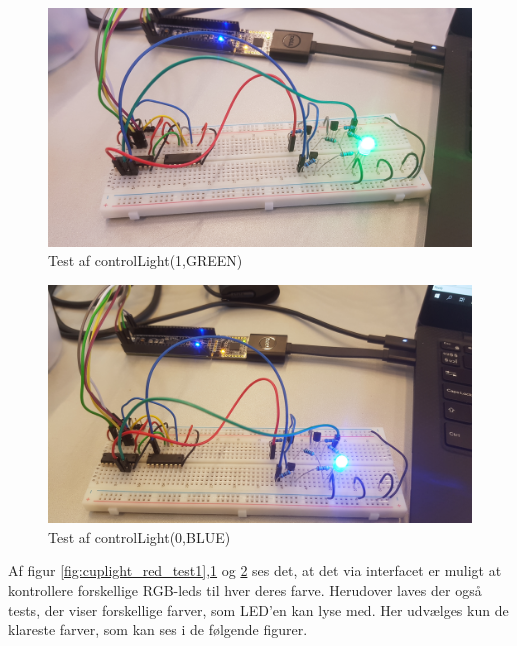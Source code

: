 \documentclass[Modultest/Modultest_main.tex]{subfiles}
\begin{document}
\begin{figure}[H]
    \centering
    \includegraphics[width=\textwidth]{Modultest/CupLight/graphics/interface_test2.jpg}
    \caption{Test af controlLight(1,GREEN)}
    \label{fig:cuplight_green_test2}
\end{figure}

\begin{figure}[H]
    \centering
    \includegraphics[width=\textwidth]{Modultest/CupLight/graphics/interface_test3.jpg}
    \caption{Test af controlLight(0,BLUE)}
    \label{fig:cuplight_blue_test3}
\end{figure}

Af figur \ref{fig:cuplight_red_test1},\ref{fig:cuplight_green_test2} og \ref{fig:cuplight_blue_test3} ses det, at det via interfacet er muligt at kontrollere forskellige RGB-leds til hver deres farve. Herudover laves der også tests, der viser forskellige farver, som LED'en kan lyse med. Her udvælges kun de klareste farver, som kan ses i de følgende figurer.
\end{document}
